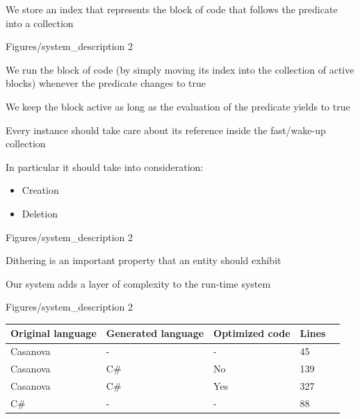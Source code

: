\documentclass{beamer}
\begin{document}
\begin{pictures2TextSlide}{
\item We store an index that represents the block of code that follows the predicate into a collection
}
{Figures/system_description 2}
{\item We run the block of code (by simply moving its index into the collection of active blocks) whenever the predicate changes to true
\item We keep the block active as long as the evaluation of the predicate yields to true}
\end{pictures2TextSlide}


\begin{picturetextslide}
{
\item Every instance should take care about its reference inside the fast/wake-up collection
\item In particular it should take into consideration:
\item[]
\begin{itemize}
\item Creation
\item Deletion
\end{itemize}
}
{Figures/system_description 2}
\end{picturetextslide}


\begin{picturetextslide}
{
\item Dithering is an important property that an entity should exhibit
\item Our system adds a layer of complexity to the run-time system
}
{Figures/system_description 2}
\end{picturetextslide}


\begin{frame}[fragile]{\CurrentSection}
\begin{block}{\CurrentSubSection}
\begin{table}
\begin{tabular}{||L{2cm}|L{2cm}|L{2cm}|L{2cm}|L{2cm}}
\hline
\hline
  Original language & Generated language & Optimized code & Lines \\ \hline
  Casanova & - & - & 45 \\
  Casanova & C\# & No & 139 \\
  Casanova & C\# & Yes & 327 \\
  C\# & - & - & 88\\
\hline  
\end{tabular}
\end{table}
\end{block}
\end{frame}
\end{document}
